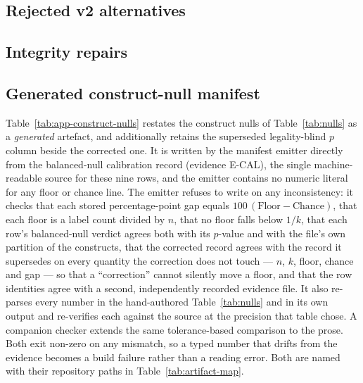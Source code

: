 


\FloatBarrier

\subsection{Rejected v2 alternatives}



\FloatBarrier

\clearpage
\subsection{Integrity repairs}



\FloatBarrier

\subsection{Generated construct-null manifest}
\label{app:generated-nulls}

Table~\ref{tab:app-construct-nulls} restates the construct nulls of
Table~\ref{tab:nulls} as a \emph{generated} artefact, and additionally retains the
superseded legality-blind $p$ column beside the corrected one. It is written by
the manifest emitter directly from the balanced-null calibration record
(evidence \textsf{E-CAL}), the single
machine-readable source for these nine rows, and the emitter contains no numeric
literal for any floor or chance line. The emitter refuses to write on any
inconsistency: it checks that each stored percentage-point gap equals
$100\,(\text{Floor}-\text{Chance})$, that each floor is a label count divided by
$n$, that no floor falls below $1/k$, that each row's balanced-null verdict
agrees both with its $p$-value and with the file's own partition of the
constructs, that the corrected record agrees with the record it supersedes on
every quantity the correction does not touch --- $n$, $k$, floor, chance and gap
--- so that a ``correction'' cannot silently move a floor, and that the row
identities agree with a second, independently recorded evidence file. It also
re-parses every number in the hand-authored
Table~\ref{tab:nulls} and in its own output and re-verifies each against the
source at the precision that table chose. A companion checker extends the same
tolerance-based comparison to the prose. Both exit non-zero on any mismatch, so a
typed number that drifts from the evidence becomes a build failure rather than a
reading error. Both are named with their repository paths in
Table~\ref{tab:artifact-map}.


